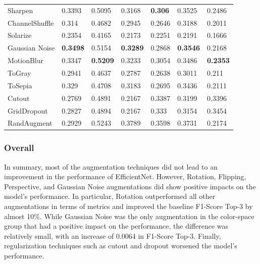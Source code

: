 \begin{table}[!h]
\begin{tabular}{|l|lll|lll|}
        Sharpen & 0.3393 & 0.5095 & 0.3168 & \textbf{0.306} & 0.3525 & 0.2486 \\ 
        ChannelShuffle & 0.314 & 0.4682 & 0.2945 & 0.2646 & 0.3188 & 0.2011 \\ 
        Solarize & 0.2354 & 0.4165 & 0.2173 & 0.2251 & 0.2191 & 0.1666 \\ 
        Gaussian Noise & \textbf{0.3498} & 0.5154 & \textbf{0.3289} & 0.2868 & \textbf{0.3546} & 0.2168 \\ 
        MotionBlur & 0.3347 & \textbf{0.5209} & 0.3233 & 0.3054 & 0.3486 & \textbf{0.2353} \\ 
        ToGray & 0.2941 & 0.4637 & 0.2787 & 0.2638 & 0.3011 & 0.211 \\ 
        ToSepia & 0.329 & 0.4708 & 0.3183 & 0.2695 & 0.3436 & 0.2111 \\ \hline
        Cutout & 0.2769 & 0.4891 & 0.2167 & 0.3387 & 0.3199 & 0.3396 \\ 
        GridDropout & 0.2827 & 0.4894 & 0.2167 & 0.333 & 0.3154 & 0.3454 \\ \hline
        RandAugment & 0.2929 & 0.5243 & 0.3789 & 0.3598 & 0.3731 & 0.2174 \\ 
    \hline
    \end{tabular}
    
\end{table}

\subsubsection{Overall}
In summary, most of the augmentation techniques did not lead to an improvement in the performance of EfficientNet. However, Rotation, Flipping, Perspective, and Gaussian Noise augmentations did show positive impacts on the model's performance. In particular, Rotation outperformed all other augmentations in terms of metrics and improved the baseline F1-Score Top-3 by almost 10\%. While Gaussian Noise was the only augmentation in the color-space group that had a positive impact on the performance, the difference was relatively small, with an increase of 0.0064 in F1-Score Top-3. Finally, regularization techniques such as cutout and dropout worsened the model's performance.

